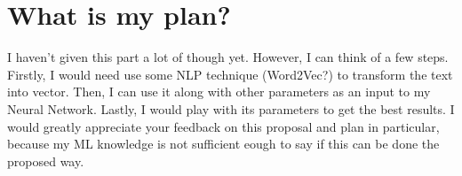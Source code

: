 \documentclass{article}
\begin{document}
\section*{What is my plan?}
I haven't given this part a lot of though yet. However, I can think of a few steps.
Firstly, I would need use some NLP technique (Word2Vec?) to transform the text into vector. Then, I can use it along
with other parameters as an input to my Neural Network. Lastly, I would play with its parameters to get the best results.
I would greatly appreciate your feedback on this proposal and plan in particular, because my ML knowledge is not sufficient
eough to say if this can be done the proposed way.
\end{document}
